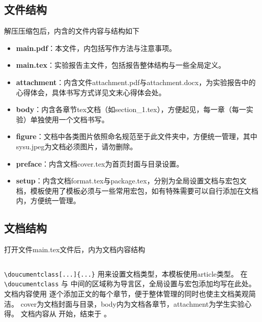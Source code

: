 \subsection{文件结构}
解压压缩包后，内含的文件内容与结构如下
\begin{itemize}
\item \textbf{main.pdf}：本文件，内包括写作方法与注意事项。
\item \textbf{main.tex}：实验报告主文件，包括报告整体结构与一些全局定义。
\item \textbf{attachment}：内含文件attachment.pdf与attachment.docx，为实验报告中的心得体会，具体书写方式详见文末心得体会处。
\item \textbf{body}：内含各章节tex文档（如section\_1.tex），方便起见，每一章（每一实验）单独使用一个文档书写。
\item \textbf{figure}：文档中各类图片依照命名规范至于此文件夹中，方便统一管理，其中sysu.jpeg为文档必须图片，请勿删除。
\item \textbf{preface}：内含文档cover.tex为首页封面与目录设置。
\item \textbf{setup}：内含文档format.tex与package.tex，分别为全局设置文档与宏包文档，模板使用了模板必须与一些常用宏包，如有特殊需要可以自行添加在文档内，方便统一管理。
\end{itemize}

\subsection{文档结构}
打开文件main.tex文件后，内为文档内容结构

\inputminted[linenos,frame=lines]{latex}{main.tex}

\verb|\doucumentclass[...]{...}| 用来设置文档类型，本模板使用article类型。
在 \verb|\doucumentclass| 与 \verb|| 中间的区域称为导言区，全局设置与宏包添加均写在此处。
文档内容使用 \verb|| 逐个添加正文的每个章节，便于整体管理的同时也使主文档美观简洁。
cover为文档封面与目录，body内为文档各章节，attachment为学生实验心得。
文档内容从 \verb|| 开始，结束于 \verb|| 。
